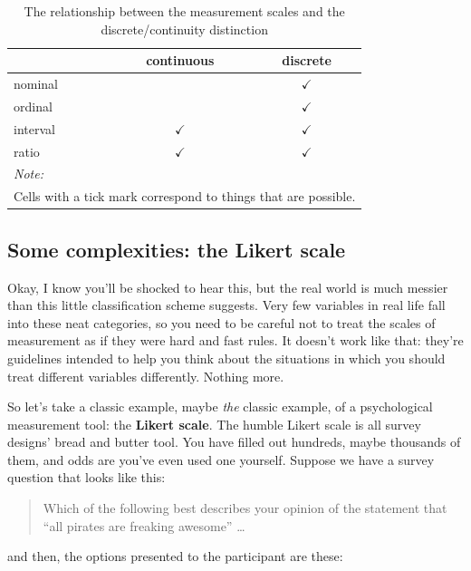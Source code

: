 \documentclass[
]{book}
\theoremstyle{definition}
\theoremstyle{definition}
\theoremstyle{definition}
\theoremstyle{definition}
\theoremstyle{remark}
\begin{document}
\begin{table}[H]

\caption{\label{tab:scalescont}The relationship between the measurement scales
       and the discrete/continuity distinction}
\centering
\begin{tabular}[t]{lcc}
\toprule
 & continuous & discrete\\
\midrule
nominal &  & $\checkmark$\\
ordinal &  & $\checkmark$\\
interval & $\checkmark$ & $\checkmark$\\
ratio & $\checkmark$ & $\checkmark$\\
\bottomrule
\multicolumn{3}{l}{\rule{0pt}{1em}\textit{Note: }}\\
\multicolumn{3}{l}{\rule{0pt}{1em}Cells with a tick mark correspond to things that are possible.}\\
\end{tabular}
\end{table}

\hypertarget{likertscale}{%
\subsection{Some complexities: the Likert scale}\label{likertscale}}

Okay, I know you'll be shocked to hear this, but the real world is much messier than this little classification scheme suggests. Very few variables in real life fall into these neat categories, so you need to be careful not to treat the scales of measurement as if they were hard and fast rules. It doesn't work like that: they're guidelines intended to help you think about the situations in which you should treat different variables differently. Nothing more.

So let's take a classic example, maybe \emph{the} classic example, of a psychological measurement tool: the \textbf{Likert scale}. The humble Likert scale is all survey designs' bread and butter tool. You have filled out hundreds, maybe thousands of them, and odds are you've even used one yourself. Suppose we have a survey question that looks like this:

\begin{quote}
Which of the following best describes your opinion of the statement that ``all pirates are freaking awesome'' \ldots{}
\end{quote}

and then, the options presented to the participant are these:
\end{document}
